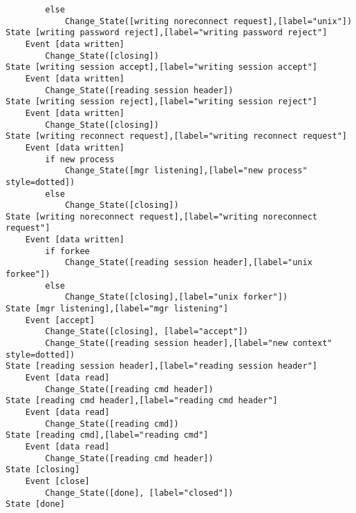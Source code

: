 \begin{verbatim}
		else
			Change_State([writing noreconnect request],[label="unix"])
State [writing password reject],[label="writing password reject"]
	Event [data written]
		Change_State([closing])
State [writing session accept],[label="writing session accept"]
	Event [data written]
		Change_State([reading session header])
State [writing session reject],[label="writing session reject"]
	Event [data written]
		Change_State([closing])
State [writing reconnect request],[label="writing reconnect request"]
	Event [data written]
		if new process
			Change_State([mgr listening],[label="new process" style=dotted])
		else
			Change_State([closing])
State [writing noreconnect request],[label="writing noreconnect request"]
	Event [data written]
		if forkee
			Change_State([reading session header],[label="unix forkee"])
		else
			Change_State([closing],[label="unix forker"])
State [mgr listening],[label="mgr listening"]
	Event [accept]
		Change_State([closing], [label="accept"])
		Change_State([reading session header],[label="new context" style=dotted])
State [reading session header],[label="reading session header"]
	Event [data read]
		Change_State([reading cmd header])
State [reading cmd header],[label="reading cmd header"]
	Event [data read]
		Change_State([reading cmd])
State [reading cmd],[label="reading cmd"]
	Event [data read]
		Change_State([reading cmd header])
State [closing]
	Event [close]
		Change_State([done], [label="closed"])
State [done]
\end{verbatim}
